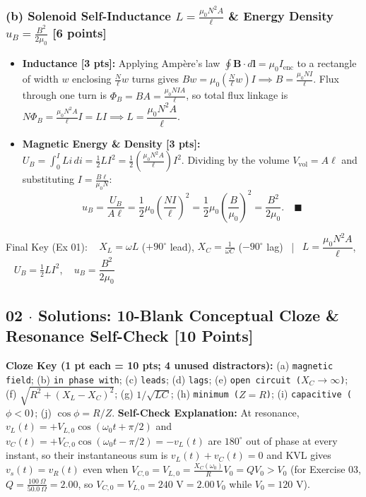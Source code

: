 \documentclass[10pt,letterpaper]{article}
\begin{document}
{  \subsubsection*{(b) Solenoid Self-Inductance $L = \frac{\mu_0 N^2 A}{\ell}$ \& Energy Density $u_B = \frac{B^2}{2\mu_0}$ [6 points]}
  \begin{itemize}
    \item \textbf{Inductance [3 pts]:} Applying Amp\`ere's law $\oint \mathbf{B}\cdot d\mathbf{l} = \mu_0 I_{\text{enc}}$ to a rectangle of width $w$ enclosing $\frac{N}{\ell}w$ turns gives $B w = \mu_0 \left(\frac{N}{\ell}w\right)I \implies B = \frac{\mu_0 N I}{\ell}$. Flux through one turn is $\Phi_B = BA = \frac{\mu_0 N I A}{\ell}$, so total flux linkage is $N\Phi_B = \frac{\mu_0 N^2 A}{\ell}I = LI \implies L = \dfrac{\mu_0 N^2 A}{\ell}$.
    \item \textbf{Magnetic Energy \& Density [3 pts]:} $U_B = \int_0^I L i\,di = \frac{1}{2}LI^2 = \frac{1}{2}\left(\frac{\mu_0 N^2 A}{\ell}\right)I^2$. Dividing by the volume $V_{\text{vol}} = A\ell$ and substituting $I = \frac{B\ell}{\mu_0 N}$:
    $$u_B = \frac{U_B}{A\ell} = \frac{1}{2}\mu_0 \left(\frac{N I}{\ell}\right)^2 = \frac{1}{2}\mu_0 \left(\frac{B}{\mu_0}\right)^2 = \frac{B^2}{2\mu_0}. \quad \blacksquare$$
  \end{itemize}

Final Key (Ex 01): ~ $X_L = \omega L$ ($+90^\circ$ lead), $X_C = \frac{1}{\omega C}$ ($-90^\circ$ lag) ~|~ $L = \dfrac{\mu_0 N^2 A}{\ell}$, ~ $U_B = \frac{1}{2}LI^2$, ~ $u_B = \dfrac{B^2}{2\mu_0}$

\subsection*{02 $\cdot$ Solutions: 10-Blank Conceptual Cloze \& Resonance Self-Check \hfill [10 Points]}


  \textbf{Cloze Key (1 pt each = 10 pts; 4 unused distractors):} (a) \texttt{magnetic field}; (b) \texttt{in phase with}; (c) \texttt{leads}; (d) \texttt{lags}; (e) \texttt{open circuit ($X_C \to \infty$)}; (f) \texttt{$\sqrt{R^2 + (X_L - X_C)^2}$}; (g) \texttt{$1/\sqrt{LC}$}; (h) \texttt{minimum ($Z = R$)}; (i) \texttt{capacitive ($\phi < 0$)}; (j) \texttt{$\cos\phi = R/Z$}.
  \textbf{Self-Check Explanation:} At resonance, $v_L(t) = +V_{L,0}\cos(\omega_0 t + \pi/2)$ and $v_C(t) = +V_{C,0}\cos(\omega_0 t - \pi/2) = -v_L(t)$ are $180^\circ$ out of phase at every instant, so their instantaneous sum is $v_L(t) + v_C(t) = 0$ and KVL gives $v_s(t) = v_R(t)$ even when $V_{C,0} = V_{L,0} = \frac{X_C(\omega_0)}{R}V_0 = Q V_0 > V_0$ (for Exercise 03, $Q = \frac{100\ \Omega}{50.0\ \Omega} = 2.00$, so $V_{C,0} = V_{L,0} = 240\text{ V} = 2.00\,V_0$ while $V_0 = 120\text{ V}$).



}
\end{document}

